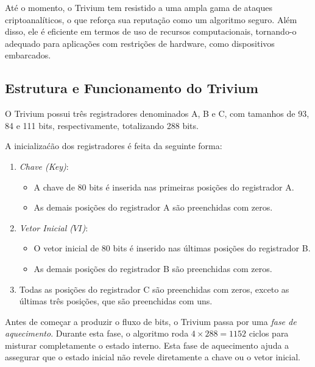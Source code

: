 Até o momento, o Trivium tem resistido a uma ampla gama de ataques criptoanalíticos, o que reforça sua reputação como um algoritmo seguro.
Além disso, ele é eficiente em termos de uso de recursos computacionais, tornando-o adequado para aplicações com restrições de hardware, como dispositivos embarcados.

\subsection*{Estrutura e Funcionamento do Trivium}

O Trivium possui três registradores denominados A, B e C, com tamanhos de 93, 84 e 111 bits, respectivamente, totalizando 288 bits.

A inicializaćão dos registradores é feita da seguinte forma:

\begin{enumerate}
\item {\em Chave (Key)}:
  \begin{itemize}
  \item A chave de 80 bits é inserida nas primeiras posições do registrador A.
  \item As demais posições do registrador A são preenchidas com zeros.
  \end{itemize}
  
\item {\em Vetor Inicial ($VI$)}:
  \begin{itemize}
  \item O vetor inicial de 80 bits é inserido nas últimas posições do registrador B.
  \item As demais posições do registrador B são preenchidas com zeros.
  \end{itemize}
    
\item Todas as posições do registrador C são preenchidas com zeros, exceto as últimas três posições, que são preenchidas com uns.    
\end{enumerate}

Antes de começar a produzir o fluxo de bits, o Trivium passa por uma {\em fase de aquecimento}.
Durante esta fase, o algoritmo roda $4 \times 288 = 1152$ ciclos para misturar completamente o estado interno.
Esta fase de aquecimento ajuda a assegurar que o estado inicial não revele diretamente a chave ou o vetor inicial.

